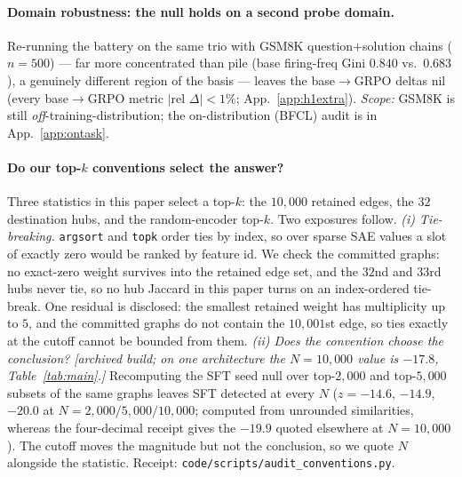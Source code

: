 \documentclass{article}
\begin{document}
\paragraph{Domain robustness: the null holds on a second probe domain.} Re-running the battery on the same trio with GSM8K question$+$solution chains ($n{=}500$) --- far more concentrated than pile (base firing-freq Gini $0.840$ vs.\ $0.683$), a genuinely different region of the basis --- leaves the base$\to$GRPO deltas nil (every base$\to$GRPO metric $|\text{rel }\Delta|<1\%$; App.~\ref{app:h1extra}). \emph{Scope:} GSM8K is still \emph{off}-training-distribution; the on-distribution (BFCL) audit is in App.~\ref{app:ontask}.

\paragraph{Do our top-$k$ conventions select the answer?} Three statistics in this paper select a top-$k$: the $10{,}000$ retained edges, the $32$ destination hubs, and the random-encoder top-$k$. Two exposures follow. \emph{(i) Tie-breaking.} \texttt{argsort} and \texttt{topk} order ties by index, so over sparse SAE values a slot of exactly zero would be ranked by feature id. We check the committed graphs: no exact-zero weight survives into the retained edge set, and the $32$nd and $33$rd hubs never tie, so no hub Jaccard in this paper turns on an index-ordered tie-break. One residual is disclosed: the smallest retained weight has multiplicity up to $5$, and the committed graphs do not contain the $10{,}001$st edge, so ties exactly at the cutoff cannot be bounded from them. \emph{(ii) Does the convention choose the conclusion?} \emph{[archived build; on one architecture the $N=10{,}000$ value is $-17.8$, Table~\ref{tab:main}.]} Recomputing the SFT seed null over top-$2{,}000$ and top-$5{,}000$ subsets of the same graphs leaves SFT detected at every $N$ ($z=-14.6$, $-14.9$, $-20.0$ at $N=2{,}000/5{,}000/10{,}000$; computed from unrounded similarities, whereas the four-decimal receipt gives the $-19.9$ quoted elsewhere at $N=10{,}000$). The cutoff moves the magnitude but not the conclusion, so we quote $N$ alongside the statistic. Receipt: \texttt{code/scripts/audit\_conventions.py}.
\end{document}
